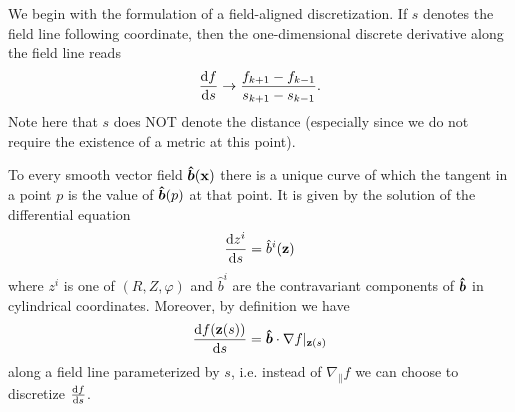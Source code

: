 We begin with the formulation of a field-aligned discretization. If $s$ denotes the 
field line following coordinate, then the one-dimensional discrete derivative along the field line reads
\begin{align}
    \frac{\mathrm{d} f }{\mathrm{d} s} \rightarrow \frac{f_{k+1}-f_{k-1}}{s_{k+1} - s_{k-1}}.
    \label{eq:proposition}
\end{align}
Note here that $s$ does NOT denote the distance 
(especially since we do not require the existence of a metric at this point).

To every smooth vector field $\bm{\hat{b}}({\mathbf{x}})$ there is a unique curve of which the
tangent in a point $p$ is the value of $\bm{\hat{b}}(p)$ at that point. It is given by
the solution of the differential equation
\begin{align}
    \frac{\mathrm{d} z^i}{\mathrm{d} s} = \hat b^i({\mathbf{z}})
    \label{eq:integralcurve}
\end{align}
where $z^i$ is one of $(R, Z, \varphi)$ and $\hat b^i$ are the contravariant components
of $\bm{\hat{b}}$ in cylindrical coordinates. 
Moreover, by definition we have
\begin{align}
    \frac{\mathrm{d} f({\mathbf{z}}(s))}{\mathrm{d} s} = \bm{\hat{b}}\cdot \nabla f|_{{\mathbf{z}}(s)}
    \label{}
\end{align}
along a field line parameterized by $s$, 
i.e. instead of $\nabla_\parallel f$ we can choose to discretize $\frac{\mathrm{d} f}{\mathrm{d} s}$.

